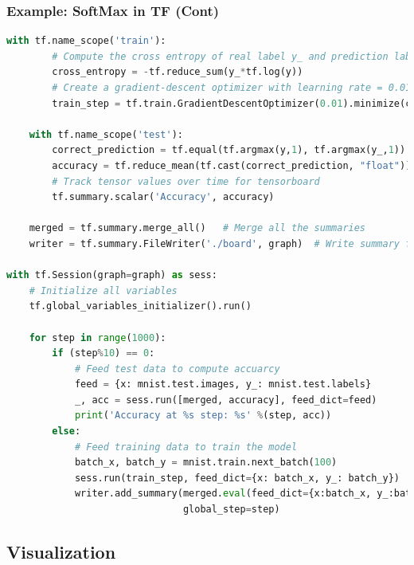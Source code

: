 \begin{frame}[fragile]
  \MyLogo
  \frametitle{Example: SoftMax in TF (Cont)}  

\ContinueLineNumber
\begin{lstlisting}[language=python]
	with tf.name_scope('train'):
		# Compute the cross entropy of real label y_ and prediction labe y
		cross_entropy = -tf.reduce_sum(y_*tf.log(y))
		# Create a gradient-descent optimizer with learning rate = 0.01
		train_step = tf.train.GradientDescentOptimizer(0.01).minimize(cross_entropy)

	with tf.name_scope('test'):
		correct_prediction = tf.equal(tf.argmax(y,1), tf.argmax(y_,1))
		accuracy = tf.reduce_mean(tf.cast(correct_prediction, "float"))
		# Track tensor values over time for tensorboard
		tf.summary.scalar('Accuracy', accuracy)
	
	merged = tf.summary.merge_all()   # Merge all the summaries
	writer = tf.summary.FileWriter('./board', graph)  # Write summary file to ./board
	
with tf.Session(graph=graph) as sess:
	# Initialize all variables
	tf.global_variables_initializer().run()
	
	for step in range(1000):
		if (step%10) == 0:
			# Feed test data to compute accuarcy
			feed = {x: mnist.test.images, y_: mnist.test.labels}
			_, acc = sess.run([merged, accuracy], feed_dict=feed)
			print('Accuracy at %s step: %s' %(step, acc))
		else:
			# Feed training data to train the model
			batch_x, batch_y = mnist.train.next_batch(100)
			sess.run(train_step, feed_dict={x: batch_x, y_: batch_y})
			writer.add_summary(merged.eval(feed_dict={x:batch_x, y_:batch}),
							   global_step=step)
\end{lstlisting}

\end{frame}

\subsection{Visualization}

